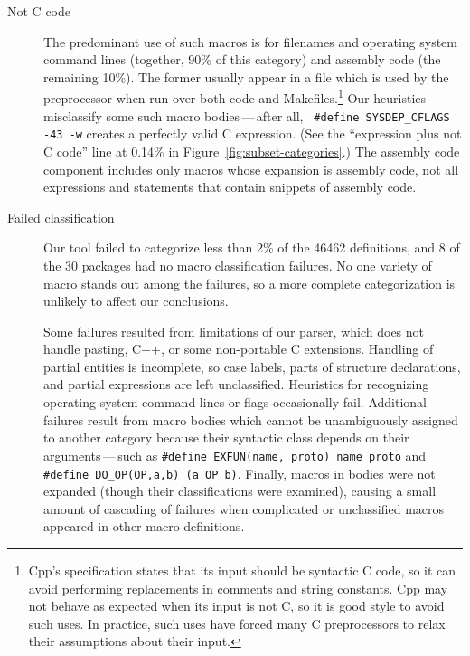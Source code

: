 \documentclass[10pt]{article}
\def\numpackages{30}
\begin{document}
\begin{description}
\item[Not C code]\label{page:not-c-code}
  The predominant use of such macros is for filenames and operating system
  command lines (together, 90\% of this category) and assembly code (the
  remaining 10\%).  The former usually appear in a file which is used by
  the preprocessor when run over both code and Makefiles.\footnote{Cpp's
    specification states that its input should be syntactic C code, so it
    can avoid performing replacements in comments and string constants.
    Cpp may not behave as expected when its input is not C, so it is good
    style to avoid such uses.  In practice, such uses have forced many C
    preprocessors to relax their assumptions about their input.}  Our
  heuristics misclassify some such macro bodies\,---\,after all, {\tt
  \#define \verb|SYSDEP_CFLAGS| -43 -w} creates a perfectly valid C
expression.  (See the ``expression plus not C code'' line at 0.14\% in
Figure~\ref{fig:subset-categories}.)  The assembly code component includes
only macros whose expansion is assembly code, not all expressions and
statements that contain snippets of assembly code.

\item[Failed classification]
  Our tool failed to categorize less than 2\% of the 46462 definitions, and
  8 of the {\numpackages} packages had no macro classification failures.
  No one variety of macro stands out among the failures, so a more complete
  categorization is unlikely to affect our conclusions.
  
  Some failures resulted from limitations of our parser, which does not
  handle pasting, C++, or some
  non-portable C extensions.  Handling of partial entities is incomplete,
  so case labels, parts of structure declarations, and partial expressions
  are left unclassified.  Heuristics for recognizing operating system
  command lines or flags occasionally fail.  Additional failures result
  from macro bodies which cannot be unambiguously assigned to another
  category because their syntactic class depends on their
  arguments\,---\,such as {\tt \#define EXFUN(name, proto) name proto} and
  {\tt \#define
\verb|DO_OP|(OP,a,b) (a OP b)}.  Finally, macros in bodies were not
expanded (though their classifications were examined), causing a small
amount of cascading of failures when complicated or unclassified macros
appeared in other macro definitions.

\end{description}
\end{document}
